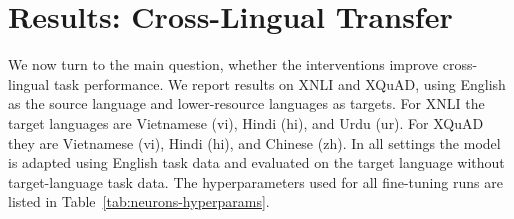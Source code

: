 \section{Results: Cross-Lingual Transfer}
\label{sec:neurons-results-transfer}

We now turn to the main question, whether the interventions improve cross-lingual
task performance. We report results on XNLI and XQuAD, using English as the source
language and lower-resource languages as targets. For XNLI the target languages are
Vietnamese (vi), Hindi (hi), and Urdu (ur). For XQuAD they are Vietnamese (vi),
Hindi (hi), and Chinese (zh). In all settings the model is adapted using
English task data and evaluated on the target language without target-language task
data. The hyperparameters used for all fine-tuning runs are listed in
Table~\ref{tab:neurons-hyperparams}.

